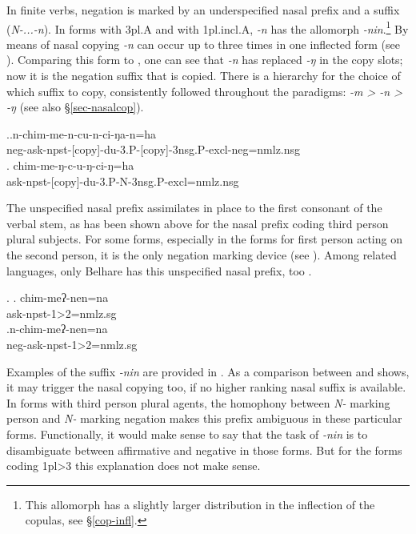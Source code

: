 In finite verbs, negation is marked by an underspecified nasal prefix and a suffix (\emph{N-...-n}). In forms with {\sc 3pl.A} and with {\sc 1pl.incl.A}, \emph{-n} has the allomorph \emph{-nin}.\footnote{This allomorph has a slightly larger distribution in the inflection of the copulas, see  §\ref{cop-infl}.} By means of  nasal copying \emph{-n} can occur up to three times in one inflected form (see \Next[a]). Comparing this form to \Next[b], one can see that \emph{-n} has replaced \emph{-ŋ} in the copy slots; now it is the negation suffix that is copied. There is a hierarchy for the choice of which suffix to copy, consistently followed throughout the paradigms: \emph{-m > -n > -ŋ} (see also §\ref{sec-nasalcop}). 

\ex.\ag.n-chim-me-n-cu-n-ci-ŋa-n=ha\\
{\sc neg-}ask{\sc -npst-[copy]-du-3.P-[copy]-3nsg.P-excl-neg=nmlz.nsg}\\
	\bg. chim-me-ŋ-c-u-ŋ-ci-ŋ=ha\\
	ask{\sc -npst-[copy]-du-3.P-N-3nsg.P-excl=nmlz.nsg}\\
	
	
The unspecified nasal prefix assimilates in place to the first consonant of the verbal stem, as has been shown above for the nasal prefix coding third person plural subjects. For some forms, especially in the forms for first person acting on the second person, it is the only negation marking device (see \Next). Among related languages, only Belhare has this unspecified nasal prefix, too \citep[554]{Bickel2003Belhare}. 

\ex. \ag.  chim-meʔ-nen=na\\
	 ask{\sc -npst-1>2=nmlz.sg}\\
		\bg.n-chim-meʔ-nen=na\\
	{\sc neg-}ask{\sc -npst-1>2=nmlz.sg}\\

	
Examples of the suffix \emph{-nin} are provided in \Next. As a comparison between \Next[a] and \Next[b] shows, it may trigger the nasal copying too, if no higher ranking nasal suffix is available. In forms with third person plural agents, the homophony between \emph{N-} marking person and \emph{N-} marking negation makes this prefix ambiguous in these particular forms. Functionally, it would make sense to say that the task of \emph{-nin} is to disambiguate between affirmative and negative in those forms. But for the forms coding {\sc 1pl>3} this explanation does not make sense. 
 
